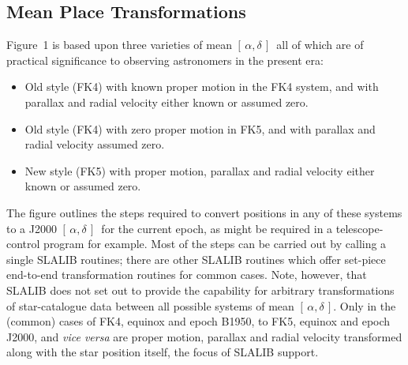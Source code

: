 \documentclass[11pt,twoside]{article}
\newcommand{\radec}     {$[\,\alpha,\delta\,]$}
\begin{document}
\subsection{Mean Place Transformations}
Figure~1 is based upon three varieties of mean \radec\ all of which are
of practical significance to observing astronomers in the present era:
\begin{itemize}
   \item Old style (FK4) with known proper motion in the FK4
         system, and with parallax and radial velocity either
         known or assumed zero.
   \item Old style (FK4) with zero proper motion in FK5,
         and with parallax and radial velocity assumed zero.
   \item New style (FK5) with proper motion, parallax and
         radial velocity either known or assumed zero.
\end{itemize}
The figure outlines the steps required to convert positions in
any of these systems to a J2000 \radec\ for the current
epoch, as might be required in a telescope-control
program for example.
Most of the steps can be carried out by calling a single
SLALIB routines;  there are other SLALIB routines which
offer set-piece end-to-end transformation routines for common cases.
Note, however, that SLALIB does not set out to provide the capability
for arbitrary transformations of star-catalogue data
between all possible systems of mean \radec.
Only in the (common) cases of FK4, equinox and epoch B1950,
to FK5, equinox and epoch J2000, and {\it vice versa}\/ are
proper motion, parallax and radial velocity transformed
along with the star position itself, the
focus of SLALIB support.
\end{document}
